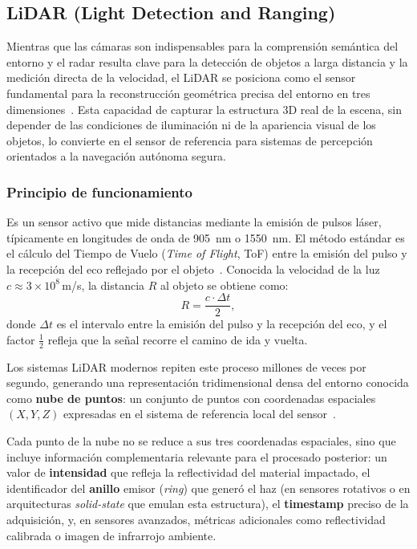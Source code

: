 \subsection{LiDAR (Light Detection and Ranging)}
\label{sec:lidar}

Mientras que las cámaras son indispensables para la comprensión
semántica del entorno y el radar resulta clave para la detección de
objetos a larga distancia y la medición directa de la velocidad, el
LiDAR se posiciona como el sensor fundamental para la reconstrucción
geométrica precisa del entorno en tres
dimensiones~\cite{royo2019lidar}. Esta capacidad de capturar la
estructura 3D real de la escena, sin depender de las condiciones de
iluminación ni de la apariencia visual de los objetos, lo convierte en
el sensor de referencia para sistemas de percepción orientados a la
navegación autónoma segura.

\subsubsection{Principio de funcionamiento}
\label{sec:lidar-principio}

Es un sensor activo que mide distancias mediante la emisión de pulsos
láser, típicamente en longitudes de onda de 905~nm o 1550~nm. El método
estándar es el cálculo del Tiempo de Vuelo (\textit{Time of Flight},
ToF) entre la emisión del pulso y la recepción del eco reflejado por el
objeto~\cite{li2020lidar}. Conocida la velocidad de la luz
$c \approx 3 \times 10^{8}$\,m/s, la distancia $R$ al objeto se obtiene
como:
\begin{equation}
    R = \frac{c \cdot \Delta t}{2},
\end{equation}
donde $\Delta t$ es el intervalo entre la emisión del pulso y la
recepción del eco, y el factor $\tfrac{1}{2}$ refleja que la señal
recorre el camino de ida y vuelta.

Los sistemas LiDAR modernos repiten este proceso millones de veces por
segundo, generando una representación tridimensional densa del entorno
conocida como \textbf{nube de puntos}: un conjunto de puntos con
coordenadas espaciales $(X, Y, Z)$ expresadas en el sistema de
referencia local del sensor~\cite{gomes2023survey}.

Cada punto de la nube no se reduce a sus tres coordenadas espaciales,
sino que incluye información complementaria relevante para el procesado
posterior: un valor de \textbf{intensidad} que refleja la reflectividad
del material impactado, el identificador del \textbf{anillo} emisor
(\textit{ring}) que generó el haz (en sensores rotativos o en
arquitecturas \textit{solid-state} que emulan esta estructura), el
\textbf{timestamp} preciso de la adquisición, y, en sensores avanzados,
métricas adicionales como reflectividad calibrada o imagen de
infrarrojo ambiente.

